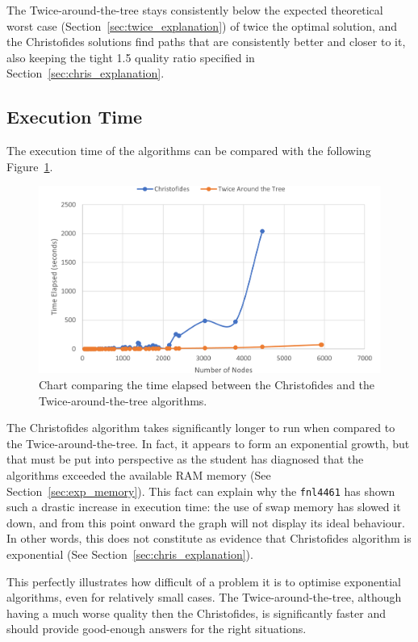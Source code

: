 \documentclass[12pt]{article}
\begin{document}
The Twice-around-the-tree stays consistently below the expected theoretical worst case (Section~\ref{sec:twice_explanation}) of 
twice the optimal solution, and the Christofides solutions find paths that are consistently better and closer to it, 
also keeping the tight 1.5 quality ratio specified in Section~\ref{sec:chris_explanation}.

\subsection{Execution Time} \label{sec:exp_time}

The execution time of the algorithms can be compared with the following Figure~\ref{fig:exec_time}.

\begin{figure}[ht]
\centering
\includegraphics[height=.325\textheight]{execution_time_comparison.png}
\caption{Chart comparing the time elapsed between the Christofides and the Twice-around-the-tree algorithms.}
\label{fig:exec_time}
\end{figure}

The Christofides algorithm takes significantly longer to run when compared to the Twice-around-the-tree. 
In fact, it appears to form an exponential growth, but that must be put into perspective as the student 
has diagnosed that the algorithms exceeded the available RAM memory (See Section~\ref{sec:exp_memory}). 
This fact can explain why the \texttt{fnl4461} has shown such a drastic increase in execution time: the use 
of swap memory has slowed it down, and from this point onward the graph will not display its ideal behaviour. In 
other words, this does not constitute as evidence that Christofides algorithm is exponential 
(See Section~\ref{sec:chris_explanation}).

This perfectly illustrates how difficult of a problem it is to optimise exponential algorithms, even for relatively 
small cases. The Twice-around-the-tree, although having a much worse quality then the Christofides, is 
significantly faster and should provide good-enough answers for the right situations.
\end{document}
